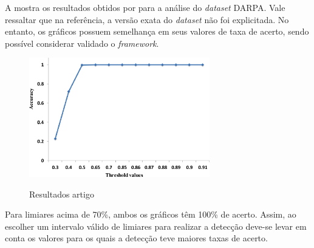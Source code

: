 A  mostra os resultados obtidos por \cite{HOQUE201748} para a análise do \textit{dataset} DARPA. Vale ressaltar que na referência, a versão exata do \textit{dataset} não foi explicitada. No entanto, os gráficos possuem semelhança em seus valores de taxa de acerto, sendo possível considerar validado o \textit{framework}.  
 \begin{figure}[htb]
 	\centering
 	\caption{Resultados artigo \cite{HOQUE201748} }
 	\includegraphics[width=0.7\textwidth]{figs/resultNHOQUE.jpg}\\
 	\label{fig:ResultsNHOQUE}
 \end{figure}

   Para limiares acima de 70\%, ambos os gráficos têm 100\% de acerto. Assim, ao escolher um intervalo válido de limiares para realizar a detecção deve-se levar em conta os valores para os quais a detecção teve maiores taxas de acerto.